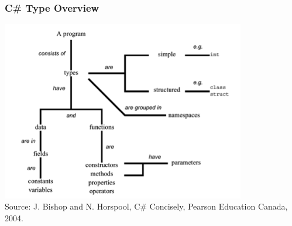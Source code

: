 \begin{frame}
\frametitle{C\# Type Overview}

\begin{center}
\includegraphics[width=0.8\textwidth]{images/ooterms.png}\\
{\tiny Source: J. Bishop and N. Horspool, C\# Concisely, Pearson Education Canada, 2004.}
\end{center}

\end{frame}



